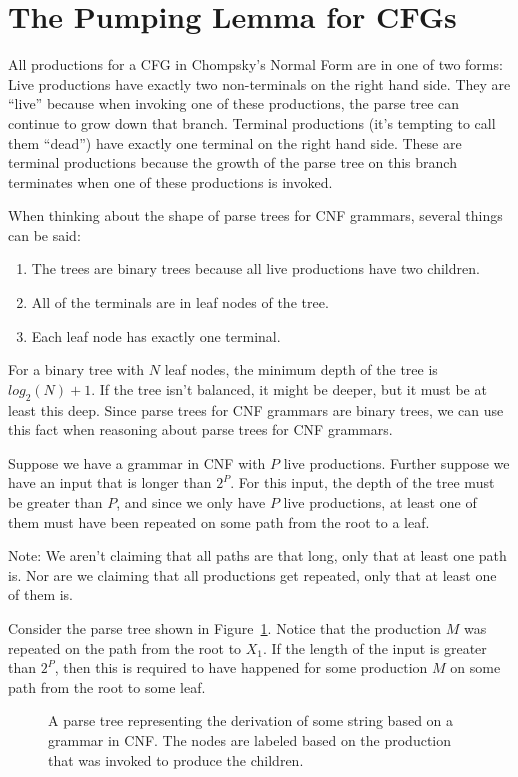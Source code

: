 \documentclass[letterpaper,12pt,openany,reqno]{book}%
\begin{document}
\section{The Pumping Lemma for CFGs}
All productions for a CFG in Chompsky's Normal Form are in one of two forms: Live productions have exactly two non-terminals on the right hand side. They are ``live'' because when invoking one of these productions, the parse tree can continue to grow down that branch. Terminal productions (it's tempting to call them ``dead'') have exactly one terminal on the right hand side. These are terminal productions because the growth of the parse tree on this branch terminates when one of these productions is invoked.

When thinking about the shape of parse trees for CNF grammars, several things can be said:
\begin{enumerate}
\item The trees are binary trees because all live productions have two children.
\item All of the terminals are in leaf nodes of the tree.
\item Each leaf node has exactly one terminal.
\end{enumerate}

For a binary tree with $N$ leaf nodes, the minimum depth of the tree is $log_2(N)+1$. If the tree isn't balanced, it might be deeper, but it must be at least this deep. Since parse trees for CNF grammars are binary trees, we can use this fact when reasoning about parse trees for CNF grammars.

Suppose we have a grammar in CNF with $P$ live productions. Further suppose we have an input that is longer than $2^P$. For this input, the depth of the tree must be greater than $P$, and since we only have $P$ live productions, at least one of them must have been repeated on some path from the root to a leaf.

Note: We aren't claiming that all paths are that long, only that at least one path is. Nor are we claiming that all productions get repeated, only that at least one of them is. 

Consider the parse tree shown in Figure~\ref{F.CFG.pump.1}. Notice that the production $M$ was repeated on the path from the root to $X_1$. If the length of the input is greater than $2^P$, then this is required to have happened for some production $M$ on some path from the root to some leaf.
\begin{figure}[htb]
\centering
{}
\caption[CNF Parse Tree]{A parse tree representing the derivation of some string based on a grammar in CNF. The nodes are labeled based on the production that was invoked to produce the children.}
\label{F.CFG.pump.1}
\end{figure}
\end{document}
